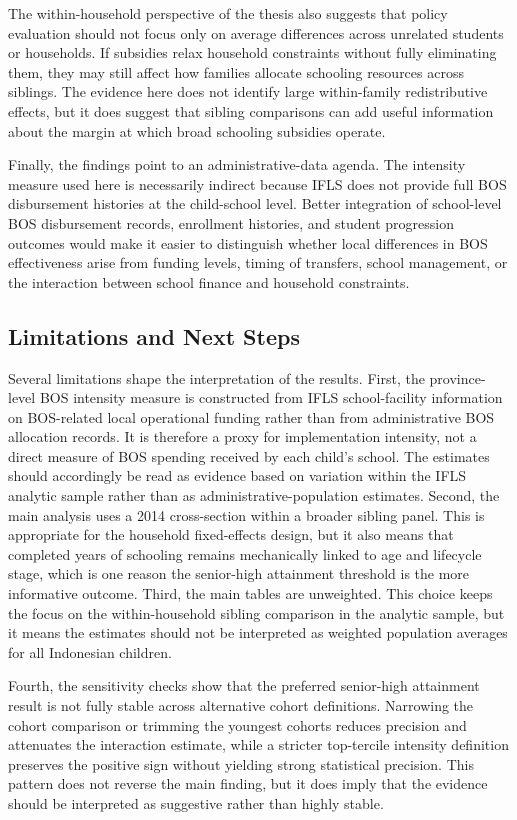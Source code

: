 \documentclass[a4paper, 12pt]{article}
\begin{document}
\begin{doublespacing}
The within-household perspective of the thesis also suggests that policy evaluation should not focus only on average differences across unrelated students or households. If subsidies relax household constraints without fully eliminating them, they may still affect how families allocate schooling resources across siblings. The evidence here does not identify large within-family redistributive effects, but it does suggest that sibling comparisons can add useful information about the margin at which broad schooling subsidies operate.

Finally, the findings point to an administrative-data agenda. The intensity measure used here is necessarily indirect because IFLS does not provide full BOS disbursement histories at the child-school level. Better integration of school-level BOS disbursement records, enrollment histories, and student progression outcomes would make it easier to distinguish whether local differences in BOS effectiveness arise from funding levels, timing of transfers, school management, or the interaction between school finance and household constraints.

\subsection{Limitations and Next Steps}
Several limitations shape the interpretation of the results. First, the province-level BOS intensity measure is constructed from IFLS school-facility information on BOS-related local operational funding rather than from administrative BOS allocation records. It is therefore a proxy for implementation intensity, not a direct measure of BOS spending received by each child's school. The estimates should accordingly be read as evidence based on variation within the IFLS analytic sample rather than as administrative-population estimates. Second, the main analysis uses a 2014 cross-section within a broader sibling panel. This is appropriate for the household fixed-effects design, but it also means that completed years of schooling remains mechanically linked to age and lifecycle stage, which is one reason the senior-high attainment threshold is the more informative outcome. Third, the main tables are unweighted. This choice keeps the focus on the within-household sibling comparison in the analytic sample, but it means the estimates should not be interpreted as weighted population averages for all Indonesian children.

Fourth, the sensitivity checks show that the preferred senior-high attainment result is not fully stable across alternative cohort definitions. Narrowing the cohort comparison or trimming the youngest cohorts reduces precision and attenuates the interaction estimate, while a stricter top-tercile intensity definition preserves the positive sign without yielding strong statistical precision. This pattern does not reverse the main finding, but it does imply that the evidence should be interpreted as suggestive rather than highly stable.


\end{doublespacing}
\end{document}
